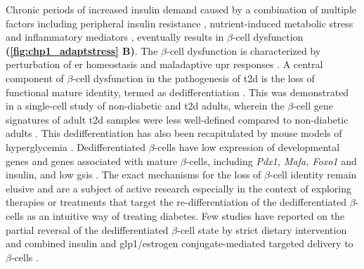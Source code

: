 \par Chronic periods of increased insulin demand caused by a combination of multiple factors including peripheral insulin resistance \textbf{\cite{petersen_mechanisms_2018}}, nutrient-induced metabolic stress \textbf{\cite{prentki_nutrient-induced_2020,cnop_endoplasmic_2017}} and inflammatory mediators \textbf{\cite{eizirik_pancreatic_2020,cosentino_crosstalk_2021}}, eventually results in $\beta$-cell dysfunction \textbf{(\autoref{fig:chp1_adaptstress} B)}. The $\beta$-cell dysfunction is characterized by perturbation of \gls{er} homeostasis and maladaptive \gls{upr} responses \textbf{\cite{kalwat_pancreatic_2021}}. A central component of $\beta$-cell dysfunction in the pathogenesis of \gls{t2d} is the loss of functional mature identity, termed as dedifferentiation \textbf{\cite{miranda_pancreatic_2021}}. This was demonstrated in a single-cell study of non-diabetic and \gls{t2d} adults, wherein the $\beta$-cell gene signatures of adult \gls{t2d} samples were less well-defined compared to non-diabetic adults \textbf{\cite{wang_single-cell_2016}}. This dedifferentiation has also been recapitulated by mouse models of hyperglycemia \textbf{\cite{sachs_targeted_2020,oppenlander_vertical_2021}}. Dedifferentiated $\beta$-cells have low expression of developmental genes and genes associated with mature $\beta$-cells, including \textit{Pdx1, Mafa, Foxo1} and insulin, and low \gls{gsis} \textbf{\cite{miranda_pancreatic_2021}}. The exact mechanisms for the loss of $\beta$-cell identity remain elusive and are a subject of active research especially in the context of exploring therapies or treatments that target the re-differentiation of the dedifferentiated $\beta$-cells as an intuitive way of treating diabetes. Few studies have reported on the partial reversal of the dedifferentiated $\beta$-cell state by strict dietary intervention \textbf{\cite{sheng_reversibility_2016,ishida_pair_2017}} and combined insulin and \gls{glp1}/estrogen conjugate-mediated targeted delivery to $\beta$-cells \textbf{\cite{sachs_targeted_2020,oppenlander_vertical_2021}}.\\



